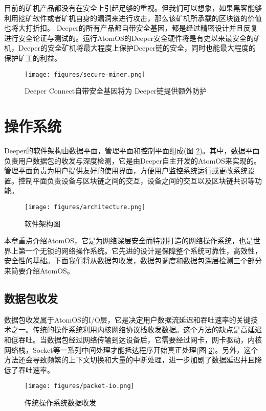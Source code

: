 \documentclass[a4paper]{article}
\begin{document}
目前的矿机产品都没有在安全上引起足够的重视。但我们可以想象，如果黑客能够利用挖矿软件或者矿机自身的漏洞来进行攻击，那么该矿机所承载的区块链的价值也将大打折扣。
Deeper的所有产品都自带安全基因，都是经过精密设计并且反复进行安全论证与测试的。运行AtomOS的Deeper安全硬件将是有史以来最安全的矿机，Deeper的安全矿机将最大程度上保护Deeper链的安全，同时也能最大程度的保护矿工的利益。

\begin{figure}[hhhh]
\centering
\texttt{[image: figures/secure-miner.png]}
\caption{Deeper Connect自带安全基因将为 Deeper链提供额外防护}
\label{fig:secure-miner}
\end{figure}

\newpage
\section{操作系统}
Deeper的软件架构由数据平面，管理平面和控制平面组成(图 \ref{fig:architecture})。其中，数据平面负责用户数据包的收发与深度检测，它是由Deeper自主开发的AtomOS来实现的。管理平面负责为用户提供友好的使用界面，方便用户监控系统运行或更改系统设置。控制平面负责设备与区块链之间的交互，设备之间的交互以及区块链共识等功能。

\begin{figure}[hhhh]
\centering
\texttt{[image: figures/architecture.png]}
\caption{软件架构图}
\label{fig:architecture}
\end{figure}

本章重点介绍AtomOS，它是为网络深层安全而特别打造的网络操作系统，也是世界上第一个无锁的网络操作系统。它先进的设计是保障整个系统可靠性，高效性，安全性的基础。下面我们将从数据包收发，数据包调度和数据包深层检测三个部分来简要介绍AtomOS。

\subsection{数据包收发}
数据包收发属于AtomOS的I/O层，它是决定用户数据流延迟和吞吐速率的关键技术之一。传统的操作系统利用内核网络协议栈收发数据。这个方法的缺点是高延迟和低吞吐。当数据包经过网络传输到达设备后，它需要经过网卡，网卡驱动，内核网络栈，Socket等一系列中间处理才能抵达程序开始真正处理(图 \ref{fig:packet-io})。另外，这个方法还会导致频繁的上下文切换和大量的中断处理，进一步加剧了数据延迟并且降低了吞吐速率。

\begin{figure}[hhhh]
\centering
\texttt{[image: figures/packet-io.png]}
\caption{传统操作系统数据收发}
\label{fig:packet-io}
\end{figure}
\end{document}
